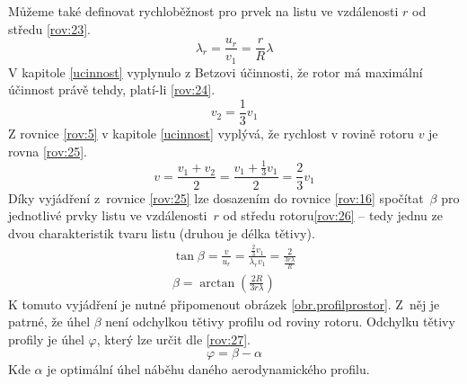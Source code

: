 	Můžeme také definovat rychloběžnost pro prvek na listu ve vzdálenosti $r$ od středu \eqref{rov:23}\cite{Rychetnik:Motory}.
	\begin{equation}
		\label{rov:23}
		\lambda_r = \frac{u_r}{v_1}=\frac{r}{R}\lambda
	\end{equation}
	V kapitole \ref{ucinnost} vyplynulo z Betzovi účinnosti, že rotor má maximální účinnost právě tehdy, platí-li \eqref{rov:24}.	
	\begin{equation}
			\label{rov:24}
			v_2 = \frac{1}{3}v_1
	\end{equation}
	Z rovnice \eqref{rov:5} v kapitole \ref{ucinnost} vyplývá, že rychlost v rovině rotoru $v$ je rovna \eqref{rov:25}\cite{Rychetnik:Motory}.
	\begin{equation}
		\label{rov:25}
		v = \frac{v_1+v_2}{2}=\frac{v_1+\frac{1}{3}v_1}{2}=\frac{2}{3}v_1
	\end{equation}
	Díky vyjádření z~rovnice \eqref{rov:25} lze dosazením do rovnice \eqref{rov:16} spočítat~$\beta$ pro jednotlivé prvky listu ve vzdálenosti~$r$ od středu rotoru\eqref{rov:26} – tedy jednu ze dvou charakteristik tvaru listu (druhou je délka tětivy)\cite{Rychetnik:Motory}.
	\begin{eqnarray}
		\label{rov:26}
		\tan\beta=\frac{v}{u_r}=\frac{\frac{2}{3}v_1}{\lambda_r v_1}=\frac{2}{\frac{3r\lambda}{R}} \nonumber \\
		\beta = \arctan(\frac{2R}{3r\lambda})
	\end{eqnarray}
	K tomuto vyjádření je nutné připomenout obrázek \ref{obr.profilprostor}. Z~něj je patrné, že úhel $\beta$ není odchylkou tětivy profilu od roviny rotoru. Odchylku tětivy profily je úhel $\varphi$, který lze určit dle \eqref{rov:27}.
	\begin{equation}
		\label{rov:27}
		\varphi = \beta - \alpha
	\end{equation}
	Kde $\alpha$ je optimální úhel náběhu daného aerodynamického profilu.
	
